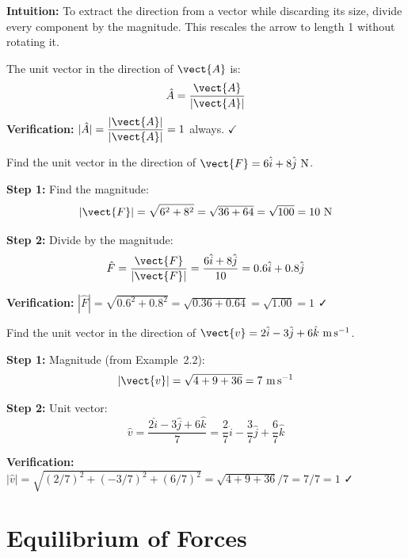 \textbf{Intuition:} To extract the direction from a
vector while discarding its size, divide every component
by the magnitude. This rescales the arrow to length 1
without rotating it.

\begin{lawbox}
The unit vector in the direction of $\vect{A}$ is:
\[
  \hat{A} = \frac{\vect{A}}{|\vect{A}|}
\]
\textbf{Verification:} $|\hat{A}|
= \dfrac{|\vect{A}|}{|\vect{A}|} = 1$ always. $\checkmark$
\end{lawbox}

\begin{examplebox}[2.10]
Find the unit vector in the direction of
$\vect{F} = 6\hat{i} + 8\hat{j}\ \text{N}$.
\end{examplebox}

\begin{solutionbox}
\textbf{Step 1:} Find the magnitude:
\[
  |\vect{F}| = \sqrt{6^2 + 8^2}
  = \sqrt{36 + 64} = \sqrt{100} = 10\ \text{N}
\]

\textbf{Step 2:} Divide by the magnitude:
\[
  \hat{F} = \frac{\vect{F}}{|\vect{F}|}
  = \frac{6\hat{i} + 8\hat{j}}{10}
  = 0.6\hat{i} + 0.8\hat{j}
\]

\textbf{Verification:}
$|\hat{F}| = \sqrt{0.6^2 + 0.8^2}
= \sqrt{0.36 + 0.64} = \sqrt{1.00} = 1$ ✓
\end{solutionbox}

\begin{examplebox}[2.11]
Find the unit vector in the direction of
$\vect{v} = 2\hat{i} - 3\hat{j} + 6\hat{k}\ \text{m\,s}^{-1}$.
\end{examplebox}

\begin{solutionbox}
\textbf{Step 1:} Magnitude (from Example~2.2):
\[
  |\vect{v}| = \sqrt{4 + 9 + 36} = 7\ \text{m\,s}^{-1}
\]

\textbf{Step 2:} Unit vector:
\[
  \hat{v} = \frac{2\hat{i} - 3\hat{j} + 6\hat{k}}{7}
  = \frac{2}{7}\hat{i} - \frac{3}{7}\hat{j}
  + \frac{6}{7}\hat{k}
\]

\textbf{Verification:}
$|\hat{v}| = \sqrt{(2/7)^2+(-3/7)^2+(6/7)^2}
= \sqrt{4+9+36}/7 = 7/7 = 1$ ✓
\end{solutionbox}

\section{Equilibrium of Forces}

